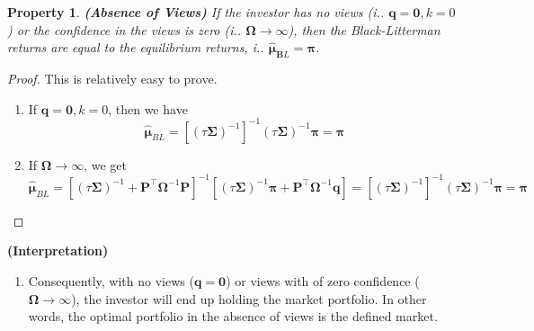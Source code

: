 \documentclass[13pt]{article}
\newtheorem{property}[theorem]{Property}
\theoremstyle{definition}
\theoremstyle{remark}
\newenvironment{remark}
  {\pushQED{\qed}\renewcommand{\qedsymbol}{$\triangle$}\remarkx}
  {\popQED\endremarkx}
\begin{document}
\begin{property} \textbf{(Absence of Views)}
    If the
investor has no views (i..
$\bm{q} = \bm{0}, k=0$) or the confidence in the views is zero (i.. $\mathbf{\Omega}\to \infty$), then the Black-Litterman returns are equal to the
equilibrium returns, i.. $\bm{\hat{\bm{\mu}}}_{\mathbf{B} L}=\bm{\pi}$. 
\end{property}
\begin{proof}
    This is relatively easy to prove. 
    \begin{enumerate}[label=(\alph*)]
        \item If $\bm{q} = \bm{0}, k=0$, then we have
        \[
        \bm{\hat{\bm{\mu}}}_{BL} =\left[(\tau \mathbf{\Sigma})^{-1}\right]^{-1}(\tau \mathbf{\Sigma})^{-1} \bm{\pi} =\bm{\pi}
        \]
        \item If $\mathbf{\Omega}\to \infty$, we get
        \[
        \bm{\hat{\bm{\mu}}}_{BL}=\left[(\tau \mathbf{\Sigma})^{-1}+\mathbf{P}^\top \mathbf{\Omega}^{-1} \mathbf{P}\right]^{-1}\left[(\tau \mathbf{\Sigma})^{-1} \bm{\pi}+\mathbf{P}^\top \mathbf{\Omega}^{-1} \bm{q}\right] =\left[(\tau \mathbf{\Sigma})^{-1}\right]^{-1}(\tau \mathbf{\Sigma})^{-1} \bm{\pi} =\bm{\pi}
        \]
    \end{enumerate}
\end{proof}
\begin{remark}
    \textbf{(Interpretation)} \hfill 
    \begin{enumerate}
        \item Consequently, with no views ($\bm{q}=\bm{0}$) or views with of zero confidence ($\mathbf{\Omega}\to \infty$), the investor will end up holding the market portfolio. In other words, the optimal portfolio in the absence of views is the defined market.
    \end{enumerate}
\end{remark}
\end{document}
